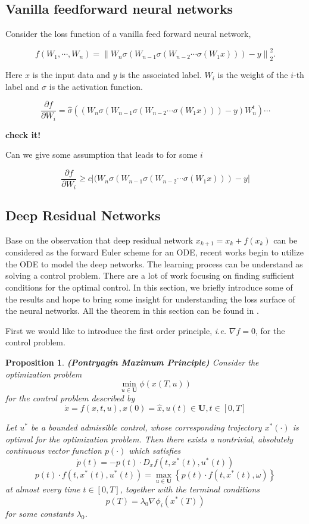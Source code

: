 \documentclass{article}
\theoremstyle{plain}
\newtheorem{prop}{Proposition}
\theoremstyle{definition}
\begin{document}
\subsection{Vanilla feedforward neural networks}
Consider the loss function of a vanilla feed forward neural network,

$$f(W_1,\cdots,W_n)=\left\|W_n\sigma (W_{n-1}\sigma(W_{n-2}\cdots\sigma(W_1x)))-y\right\|_2^2.$$

Here $x$ is the input data and $y$ is the associated label. $W_i$ is the weight of the $i$-th label and $\sigma$ is the activation function.


$$
\frac{\partial f}{\partial W_i}=\hat\sigma((W_n\sigma (W_{n-1}\sigma(W_{n-2}\cdots\sigma(W_1x)))-y)W_n^t)\cdots
$$

\textbf{check it!} 

Can we give some assumption that leads to for some $i$

$$
\frac{\partial f}{\partial W_i} \ge c|(W_n\sigma (W_{n-1}\sigma(W_{n-2}\cdots\sigma(W_1x)))-y|
$$

\subsection{Deep Residual Networks}

Base on the observation that deep residual network $x_{k+1}=x_{k}+f(x_k)$ can be considered as the forward Euler scheme for an ODE, recent works begin to utilize the ODE to model the deep networks. The learning process can be understand as solving a control problem. There are a lot of work focusing on finding sufficient conditions for the optimal control. In this section, we briefly introduce some of the results and hope to bring some insight for understanding the loss surface of the neural networks. All the theorem in this section can be found in \cite{bressan2007introduction}.

First we would like to introduce the first order principle, \emph{i.e.} $\nabla f=0$, for the control problem.
\begin{prop}
	\textbf{(Pontryagin Maximum Principle)} Consider the optimization problem $$\min_{u\in\mathbf{U}} \phi(x(T,u))$$ for the control problem described by
	$$\dot x = f(x,t,u),x(0)=\hat{x},u(t)\in\mathbf{U},t\in [0,T]$$
	
	Let $u^*$ be a bounded admissible control, whose corresponding trajectory $x^*(\cdot)$ is optimal for the optimization problem. Then there exists a nontrivial, absolutely continuous vector function $p(\cdot)$ which satisfies
	$$\dot{p}(t)=-p(t)\cdot D_xf(t,x^*(t),u^*(t))$$
	$$p(t)\cdot f(t,x^*(t),u^*(t))=\max_{u\in\mathbf{U}}\left\{p(t)\cdot f(t,x^*(t),\omega)\right\}$$
	at almost every time $t\in[0,T]$, together with the terminal conditions
	$$p(T)=\lambda_0\nabla\phi_i(x^*(T))$$
	for some constants $\lambda_0$.
\end{prop}
\end{document}
